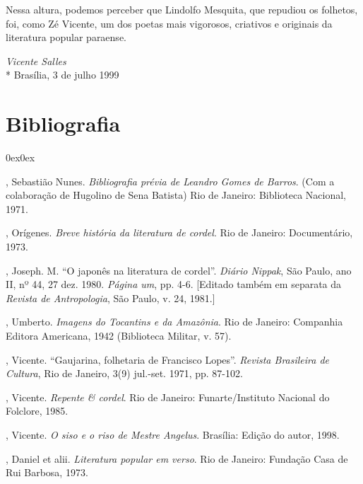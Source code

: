 Nessa altura, podemos perceber que Lindolfo Mesquita, que repudiou os
folhetos, foi, como Zé Vicente, um dos poetas mais vigorosos,
criativos e originais da literatura popular paraense.

\medskip

{\raggedleft
\textit{Vicente Salles}\\*
Brasília, 3 de julho 1999
\par}

\section{Bibliografia} 

\begin{description}0ex\parsep0ex

, Sebastião Nunes. \textit{Bibliografia prévia de Leandro Gomes de Barros}. (Com a 
colaboração de Hugolino de Sena Batista) Rio de Janeiro: Biblioteca Nacional, 1971. 

, Orígenes. \textit{Breve história da literatura de cordel}. Rio de Janeiro: Documentário, 1973.

, Joseph. M. ``O japonês na literatura de cordel''. \textit{Diário Nippak}, São Paulo,
ano II, nº 44, 27 dez. 1980. \textit{Página um}, pp. 4-6. [Editado também em separata da 
\textit{Revista de Antropologia}, São Paulo, v. 24, 1981.] 

, Umberto. \textit{Imagens do Tocantins e da Amazônia}. Rio de Janeiro: 
Companhia Editora Americana, 1942 (Biblioteca Militar, v. 57).

, Vicente. ``Gaujarina, folhetaria de Francisco Lopes''.
\textit{Revista Brasileira de Cultura}, Rio de Janeiro, 3(9) jul.-set. 1971, pp. 87-102.

, Vicente. \textit{Repente \& cordel}. Rio de Janeiro: 
Funarte/Instituto Nacional do Folclore, 1985.

, Vicente. \textit{O siso e o riso de Mestre Angelus}. Brasília: 
Edição do autor, 1998.

, Daniel et alii. \textit{Literatura popular em verso}. Rio de Janeiro: Fundação Casa de Rui Barbosa, 1973. 


\end{description}

